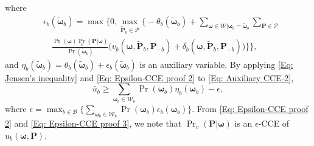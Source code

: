 \documentclass[conference]{IEEEtran}
\begin{document}
%
%
%
where
%
%
%
\begin{align*}
&\textstyle\epsilon_b( \tilde{\boldsymbol{\omega}}_b)=\max\Big\{0,\max\limits_{\tilde{\mathbf{P}}_b\in\mathcal{P}}\Big\{-\theta_b( \tilde{\boldsymbol{\omega}}_b)+\sum\limits_{\boldsymbol{\omega}\in\mathcal{W}|\boldsymbol{\omega}_b=\tilde{\boldsymbol{\omega}}_{b}}
 \sum\limits_{\mathbf{P}\in\mathcal{P}}
%
\\&\textstyle\quad\frac{\Pr(\boldsymbol{\omega}){\Pr}_v(\mathbf{P}|  \boldsymbol{\omega})}{{\Pr(\tilde{\boldsymbol{\omega}}_b)}} \big( v_b(\boldsymbol{\omega},\tilde{\mathbf{P}}_{b},\mathbf{P}_{-b})+\delta_b(\boldsymbol{\omega},\tilde{\mathbf{P}}_{b},\mathbf{P}_{-b})\big)\Big\}\Big\},
\end{align*}
%
%
%
and $\eta_b( \tilde{\boldsymbol{\omega}}_b) =\theta_b( \tilde{\boldsymbol{\omega}}_b)+\epsilon_b( \tilde{\boldsymbol{\omega}}_b)$ is an auxiliary variable.
By applying \eqref{Eq: Jensen's inequality}  and \eqref{Eq: Epsilon-CCE proof 2} to \eqref{Eq: Auxiliary CCE-2},
%
%
%
\begin{equation}
%
\bar{u}_{b}\textstyle\geq\sum_{\boldsymbol{\omega}_b\in\mathcal{W}_b}\Pr(\boldsymbol{\omega}_b)\eta_b( \boldsymbol{\omega}_b)-\epsilon,\label{Eq: Epsilon-CCE proof 3}
%
\end{equation}
%
%
%
where $\epsilon=\max_{b\in\mathcal{B}}\big\{\sum_{\boldsymbol{\omega}_b\in\mathcal{W}_b}\Pr(\boldsymbol{\omega}_b)\epsilon_b( \boldsymbol{\omega}_b)\big\}$. From  \eqref{Eq: Epsilon-CCE proof 2} and \eqref{Eq: Epsilon-CCE proof 3}, we note that $\Pr_v(\mathbf{P}|  \boldsymbol{\omega})$ is an $\epsilon$-CCE of $u_b(\boldsymbol{\omega},\mathbf{P})$.







\end{document}
